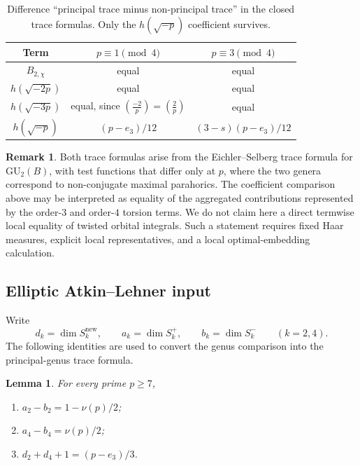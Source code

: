 \documentclass[11pt]{amsart}
\theoremstyle{plain}
\newtheorem{lemma}[theorem]{Lemma}
\theoremstyle{definition}
\newtheorem{remark}[theorem]{Remark}
\newcommand{\GU}{\mathrm{GU}}
\newcommand{\snew}{S^{\mathrm{new}}}
\providecommand{\snew}{S^{\mathrm{new}}}
\begin{document}
	\begin{table}[ht]
		\centering
		\begin{tabular}{c|c|c}
			Term & $p\equiv1\pmod4$ & $p\equiv3\pmod4$ \\
			\hline
			$B_{2,\chi}$ & equal & equal \\
			$h(\sqrt{-2p})$ & equal & equal \\
			$h(\sqrt{-3p})$ & equal, since $\left(\frac{-2}{p}\right)=\left(\frac2p\right)$ & equal \\
			$h(\sqrt{-p})$ & $(p-e_3)/12$ & $(3-s)(p-e_3)/12$ \\
		\end{tabular}
		\caption{Difference ``principal trace minus non-principal trace'' in the
			closed trace formulas. Only the $h(\sqrt{-p})$ coefficient survives.}
		\label{tab:trace-coefficients}
	\end{table}
	
	\begin{remark}
		\label{rem:global-orbital}
		Both trace formulas arise from the Eichler--Selberg trace formula for
		$\GU_2(B)$, with test functions that differ only at $p$, where the two
		genera correspond to non-conjugate maximal parahorics. The coefficient
		comparison above may be interpreted as equality of the aggregated
		contributions represented by the order-$3$ and order-$4$ torsion terms.
		We do not claim here a direct termwise local equality of twisted orbital
		integrals. Such a statement requires fixed Haar measures, explicit local
		representatives, and a local optimal-embedding calculation.
	\end{remark}
	
	\subsection{Elliptic Atkin--Lehner input}
	\label{ss:elliptic-trace-input}
	
	Write
	\[
	d_k=\dim\snew_k,\qquad
	a_k=\dim S_k^+,
	\qquad b_k=\dim S_k^-
	\qquad(k=2,4).
	\]
	The following identities are used to convert the genus comparison into the
	principal-genus trace formula.
	
	\begin{lemma}	\label{lem:elliptic-input}
		For every prime $p\ge7$,
		\begin{enumerate}[label=\textup{(\alph*)},leftmargin=2.3em]
			\item $a_2-b_2=1-\nu(p)/2$;
			\item $a_4-b_4=\nu(p)/2$;
			\item $d_2+d_4+1=(p-e_3)/3$.
		\end{enumerate}
	\end{lemma}
	
\end{document}

